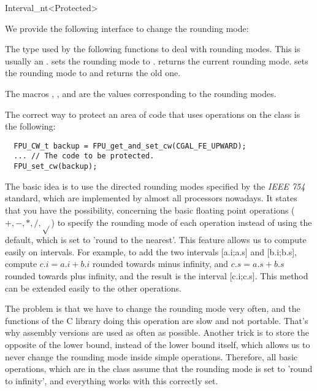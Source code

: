 \begin{ccRefClass}{Interval_nt<Protected>}
\begin{ccAdvanced}
We provide the following interface to change the rounding mode:

       {The type used by the following functions to deal with rounding modes.
       This is usually an .}
       {sets the rounding mode to .}
       {returns the current rounding mode.}
       {sets the rounding mode to  and returns the old one. }

The macros , ,
 and  are the values corresponding
to the rounding modes.

\ccExample

The correct way to protect an area of code that uses operations on the class
 is the following:

\begin{verbatim}
  FPU_CW_t backup = FPU_get_and_set_cw(CGAL_FE_UPWARD);
  ... // The code to be protected.
  FPU_set_cw(backup);
\end{verbatim}

The basic idea is to use the directed rounding modes specified by the 
{\it IEEE 754} standard, which are implemented by almost all processors 
nowadays.
It states that you have the possibility, concerning the basic floating point
operations ($+,-,*,/,\sqrt{}$) to specify the rounding mode of each operation
instead of using the default, which is set to 'round to the nearest'.
This feature allows us to compute easily on intervals.  For example, to
add the two intervals [a.i;a.s] and [b.i;b.s], compute $c.i=a.i+b.i$ rounded
towards minus infinity, and $c.s=a.s+b.s$ rounded towards plus infinity, and
the result is the interval [c.i;c.s].  This method can be extended easily to
the other operations.

The problem is that we have to change the rounding mode very often, and the
functions of the C library doing this operation are slow and not portable.
That's why assembly versions are used as often as possible.
Another trick is to store the opposite of the lower bound, instead of the
lower bound itself, which allows us to never change the rounding mode inside
simple operations.  Therefore, all basic operations, which are in the class 
 assume that the rounding mode is set to 
'round to infinity', and everything works with this correctly set.  


\end{ccAdvanced}
\end{ccRefClass}
